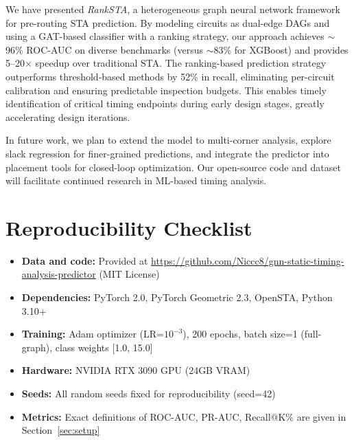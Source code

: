 We have presented \textit{RankSTA}, a heterogeneous graph neural network framework for pre-routing STA prediction. By modeling circuits as dual-edge DAGs and using a GAT-based classifier with a ranking strategy, our approach achieves $\sim$96\% ROC-AUC on diverse benchmarks (versus $\sim$83\% for XGBoost) and provides 5--20$\times$ speedup over traditional STA. The ranking-based prediction strategy outperforms threshold-based methods by 52\% in recall, eliminating per-circuit calibration and ensuring predictable inspection budgets. This enables timely identification of critical timing endpoints during early design stages, greatly accelerating design iterations.

In future work, we plan to extend the model to multi-corner analysis, explore slack regression for finer-grained predictions, and integrate the predictor into placement tools for closed-loop optimization. Our open-source code and dataset will facilitate continued research in ML-based timing analysis.

\section*{Reproducibility Checklist}
\begin{itemize}
  \item \textbf{Data and code:} Provided at \url{https://github.com/Niccc8/gnn-static-timing-analysis-predictor} (MIT License)
  \item \textbf{Dependencies:} PyTorch 2.0, PyTorch Geometric 2.3, OpenSTA, Python 3.10+
  \item \textbf{Training:} Adam optimizer (LR=$10^{-3}$), 200 epochs, batch size=1 (full-graph), class weights [1.0, 15.0]
  \item \textbf{Hardware:} NVIDIA RTX 3090 GPU (24GB VRAM)
  \item \textbf{Seeds:} All random seeds fixed for reproducibility (seed=42)
  \item \textbf{Metrics:} Exact definitions of ROC-AUC, PR-AUC, Recall@K\% are given in Section~\ref{sec:setup}
\end{itemize}
